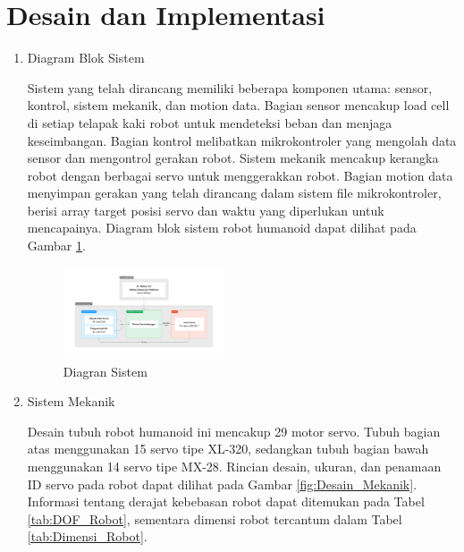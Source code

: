 \section{Desain dan Implementasi}
\label{sec:desaindanimplementasi}

\begin{enumerate}[label=\Alph*.]
    \item Diagram Blok Sistem
    \label{subsec:diagrambloksistem}

    \hspace*{1em} Sistem yang telah dirancang memiliki beberapa komponen utama: sensor, kontrol, sistem mekanik, dan motion data. Bagian sensor mencakup load cell di setiap telapak kaki robot untuk mendeteksi beban dan menjaga keseimbangan. Bagian kontrol melibatkan mikrokontroler yang mengolah data sensor dan mengontrol gerakan robot. Sistem mekanik mencakup kerangka robot dengan berbagai servo untuk menggerakkan robot. Bagian motion data menyimpan gerakan yang telah dirancang dalam sistem file mikrokontroler, berisi array target posisi servo dan waktu yang diperlukan untuk mencapainya. Diagram blok sistem robot humanoid dapat dilihat pada Gambar \ref{fig:Diagram_Sistem}.

    \begin{figure} [h] \centering
        \includegraphics[width=0.45\textwidth]{gambar/Diagram_Sistem.png}
        \caption{Diagran Sistem}
        \label{fig:Diagram_Sistem}
    \end{figure}

    \item Sistem Mekanik
    \label{subsec:sistemmekanik}

    \hspace*{1em} Desain tubuh robot humanoid ini mencakup 29 motor servo. Tubuh bagian atas menggunakan 15 servo tipe XL-320, sedangkan tubuh bagian bawah menggunakan 14 servo tipe MX-28. Rincian desain, ukuran, dan penamaan ID servo pada robot dapat dilihat pada Gambar \ref{fig:Desain_Mekanik}. Informasi tentang derajat kebebasan robot dapat ditemukan pada Tabel \ref{tab:DOF_Robot}, sementara dimensi robot tercantum dalam Tabel \ref{tab:Dimensi_Robot}.


\end{enumerate}
